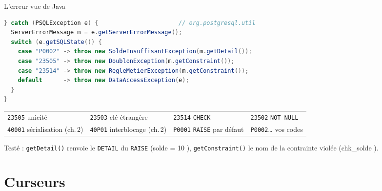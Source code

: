 \documentclass[aspectratio=169,10pt]{beamer}
\begin{document}
\begin{frame}[fragile]{L'erreur vue de Java}
\begin{lstlisting}[language=Java]
} catch (PSQLException e) {                       // org.postgresql.util
  ServerErrorMessage m = e.getServerErrorMessage();
  switch (e.getSQLState()) {
    case "P0002" -> throw new SoldeInsuffisantException(m.getDetail());
    case "23505" -> throw new DoublonException(m.getConstraint());
    case "23514" -> throw new RegleMetierException(m.getConstraint());
    default      -> throw new DataAccessException(e);
  }
}
\end{lstlisting}
  \begin{datacard}
    \scriptsize
    \begin{tabular}{@{}llll@{}}
      \toprule
      \texttt{23505} unicit\'e & \texttt{23503} cl\'e \'etrang\`ere & \texttt{23514} \texttt{CHECK} & \texttt{23502} \texttt{NOT NULL} \\
      \texttt{40001} s\'erialisation (ch.\,2) & \texttt{40P01} interblocage (ch.\,2) & \texttt{P0001} \texttt{RAISE} par d\'efaut & \texttt{P0002}\ldots{} vos codes \\
      \bottomrule
    \end{tabular}
  \end{datacard}
  {\small Test\'e : \texttt{getDetail()} renvoie le \texttt{DETAIL} du \texttt{RAISE} (\og solde = 10 \fg), \texttt{getConstraint()} le nom de la contrainte viol\'ee (\og chk\_solde \fg).}
\end{frame}

\section{Curseurs}
\end{document}
